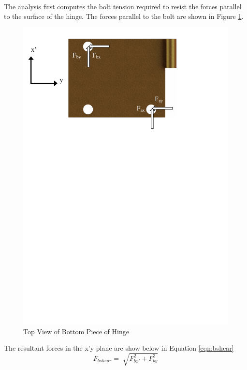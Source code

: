 \documentclass[../main.tex]{subfiles}
\begin{document}
The analysis first computes the bolt tension required to resist the forces parallel to the surface of the hinge. The forces parallel to the bolt are shown in Figure \ref{fig:hingeForce}.
\begin{figure}[H]
	\centering
	\includegraphics[width=1\textwidth]{img/gondola/hingeForces.pdf}
	\caption{Top View of Bottom Piece of Hinge}
	\label{fig:hingeForce}
\end{figure}
The resultant forces in the x'y plane are show below in Equation \ref{eqn:bshear}
\begin{displaymath}
\label{eqn:bshear}
F_{bshear} = \sqrt[]{F_{bx'}^2 + F_{by}^2}
\end{displaymath}
\end{document}
